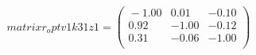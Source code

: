 \documentclass[10pt,a4paper]{article}
\begin{document}
 \begin{equation*} matrixr_optv1k31z1  =  %
\begin{pmatrix}{}
  -1.00 & 0.01 & -0.10 \\ 
  0.92 & -1.00 & -0.12 \\ 
  0.31 & -0.06 & -1.00 \\ 
  \end{pmatrix}
 \end{equation*} 
\end{document}
